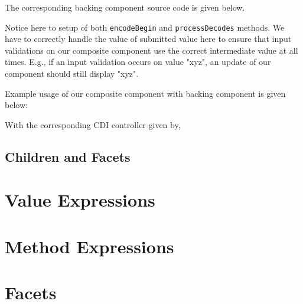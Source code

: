 The corresponding backing component source code is given below.

Notice here to setup of both \texttt{encodeBegin} and \texttt{processDecodes} methods.
We have to correctly handle the value of submitted value here to ensure that input validations on our composite component use the correct intermediate value at all times. E.g., if an input validation occurs on value "xyz", an update of our component should still display "xyz".

Example usage of our composite component with backing component is given below:

With the corresponding CDI controller given by,


\subsection{Children and Facets}

\section{Value Expressions}

\section{Method Expressions}

\section{Facets}